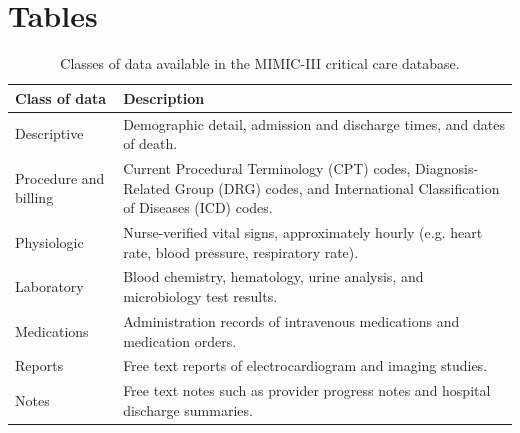 \documentclass[english]{article}
\begin{document}
\section*{Tables}





\begin{center}
\begin{table}
\begin{tabular}{|l|p{8cm}|}
    \hline
    Class of data & Description \\
    \hline
    Descriptive & Demographic detail, admission and discharge times, and dates of death. \\
    \hline
    Procedure and billing & Current Procedural Terminology (CPT) codes, Diagnosis-Related Group (DRG) codes, and International Classification of Diseases (ICD) codes. \\
    \hline
    Physiologic & Nurse-verified vital signs, approximately hourly (e.g. heart rate, blood pressure, respiratory rate). \\
    \hline
    Laboratory & Blood chemistry, hematology, urine analysis, and microbiology test results. \\
    \hline
    Medications & Administration records of intravenous medications and medication orders. \\
    \hline
    Reports & Free text reports of electrocardiogram and imaging studies. \\
    \hline
    Notes & Free text notes such as provider progress notes and hospital discharge summaries. \\
    \hline
\end{tabular}
\caption{Classes of data available in the MIMIC-III critical care database.}
\label{table:dataclasses}
\end{table}
\end{center}
\end{document}

